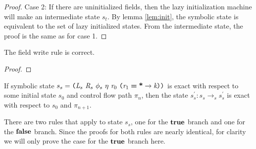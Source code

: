 \begin{proof}
Case 2: If there are uninitialized fields, then the lazy initialization machine will make an intermediate state $s_t$. By lemma \ref{lem:init}, the symbolic state is equivalent to the set of lazy initialized states. From the intermediate state, the proof is the same as for case 1.
\end{proof}

\begin{lemma}
The field write rule is correct.
\end{lemma}
\begin{proof}
\end{proof}

\begin{lemma}
If symbolic state $s_s =  \lp \cfgnt{L}_s\ \cfgnt{R}_s\ \phi_s\ \eta\ \cfgnt{r}_0\ \lp \cfgnt{r}_1\; \cfgt{=}\; \cfgt{*} \rightarrow \cfgnt{k}\rp \rp$ is exact with respect to some initial state $s_0$ and control flow path $\pi_n$, then the state $s_s^\prime : s_s \rightarrow_s s_s^\prime$ is exact with respect to $s_0$ and $\pi_{n+1}$.
\end{lemma}
There are two rules that apply to state $s_s$, one for the $\textbf{true}$ branch and one for the $\textbf{false}$ branch. Since the proofs for both rules are nearly identical, for clarity we will only prove the case for the $\textbf{true}$ branch here. 
